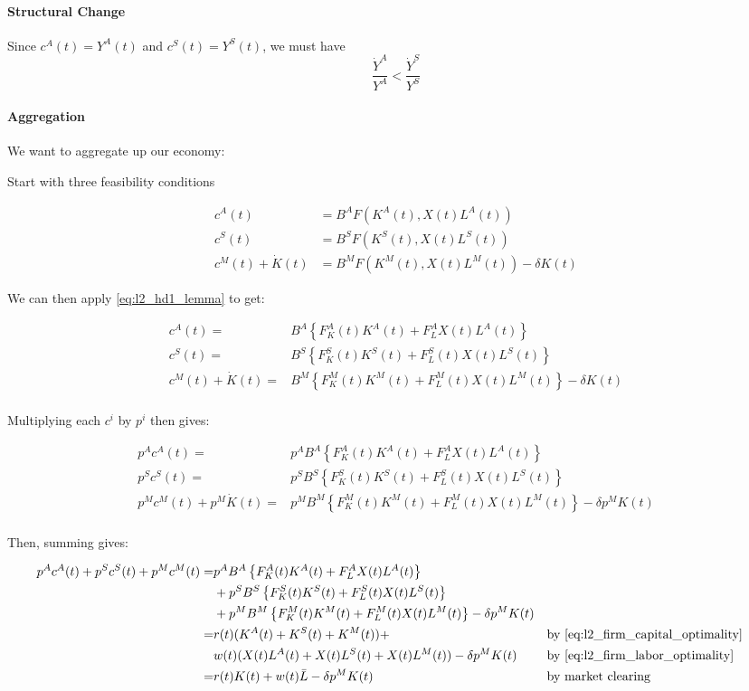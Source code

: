\documentclass[10pt]{article}
\begin{document}
\paragraph{Structural Change}

Since $c^A(t)=Y^A(t)$ and $c^S(t)=Y^S(t)$, we must have
$$
\frac{\dot{Y}^A}{Y^A}<\frac{\dot{Y}^S}{Y^S}
$$

\paragraph{Aggregation}

We want to aggregate up our economy:

Start with three feasibility conditions

\begin{align}
    c^A(t) & =B^A F\left(K^A(t), X(t) L^A(t)\right) \\
    c^S(t) & =B^S F\left(K^S(t), X(t) L^S(t)\right) \\
    c^M(t)+\dot{K}(t) & =B^M F\left(K^M(t), X(t) L^M(t)\right)-\delta K(t)
\end{align}

We can then apply \eqref{eq:l2_hd1_lemma} to get:

\begin{align}
    c^A(t)= & B^A\left\{F_K^A(t) K^A(t)+F_L^A X(t) L^A(t)\right\} \\ 
    c^S(t)= & B^S\left\{F_K^S(t) K^S(t)+F_L^S(t) X(t) L^S(t)\right\} \\ 
    c^M(t)+\dot{K}(t)= & B^M\left\{F_K^M(t) K^M(t)+F_L^M(t) X(t) L^M(t)\right\} -\delta K(t) \\ 
\end{align}

Multiplying each $c^i$ by $p^i$ then gives:

\begin{align}
    p^A c^A(t)= & p^A B^A\left\{F_K^A(t) K^A(t)+F_L^A X(t) L^A(t)\right\} \\ 
    p^S c^S(t)= & p^S B^S\left\{F_K^S(t) K^S(t)+F_L^S(t) X(t) L^S(t)\right\} \\ 
    p^M c^M(t)+p^M \dot{K}(t)= & p^M B^M\left\{F_K^M(t) K^M(t)+F_L^M(t) X(t) L^M(t)\right\} -\delta p^M K(t) \\
\end{align}

Then, summing gives:

\begin{align}
    p^A c^A(t)+p^S c^S(t)+p^M c^M(t)= & p^A B^A\left\{F_K^A(t) K^A(t)+F_L^A X(t) L^A(t)\right\} \\
    & +p^S B^S\left\{F_K^S(t) K^S(t)+F_L^S(t) X(t) L^S(t)\right\} \\
    & +p^M B^M\left\{F_K^M(t) K^M(t)+F_L^M(t) X(t) L^M(t)\right\} -\delta p^M K(t) \\
    = & r(t)(K^A(t)+K^S(t)+K^M(t)) + && \text{by \eqref{eq:l2_firm_capital_optimality}} \\
    &w(t)(X(t) L^A(t)+X(t) L^S(t)+X(t) L^M(t)) -\delta p^M K(t) && \text{by \eqref{eq:l2_firm_labor_optimality}} \\
    = & r(t) K(t) + w(t) \bar{L} -\delta p^M K(t) && \text{by market clearing}
\end{align}
\end{document}
